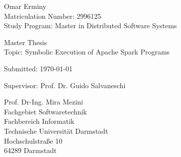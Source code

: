 \begin{tabular}{c}\end{tabular}
\vfill
Omar Erminy\\
Matriculation Number: 2996125\\
Study Program: Master in Distributed Software Systems
 
Master Thesis\\
Topic: Symbolic Execution of Apache Spark Programs

Submitted: \today

Supervisor: Prof. Dr. Guido Salvaneschi

Prof. Dr-Ing. Mira Mezini\\
Fachgebiet Softwaretechnik\\
Fachbereich Informatik\\
Technische Universität Darmstadt\\
Hochschulstraße 10\\
64289 Darmstadt